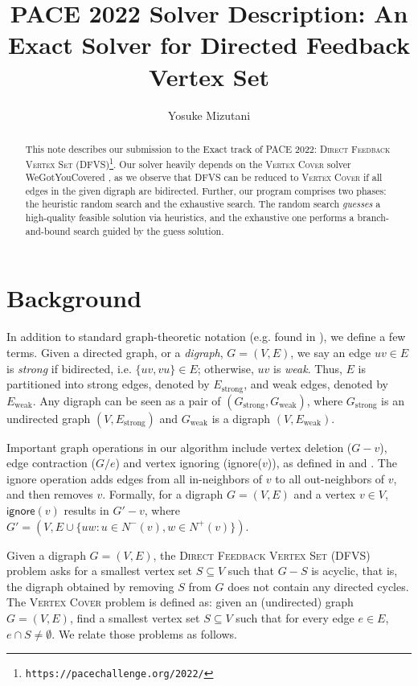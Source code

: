\documentclass[a4paper,UKenglish,cleveref, autoref, thm-restate]{lipics-v2021}
\title{PACE 2022 Solver Description: An Exact Solver for Directed Feedback Vertex Set} %
\author{Yosuke Mizutani}{\universityOfUtah}{yos@cs.utah.edu}{https://orcid.org/0000-0002-9847-4890}{}
\begin{document}
\maketitle

\begin{abstract}
This note describes our submission to the Exact track of PACE 2022:
 \textsc{Direct Feedback Vertex Set} (\textsc{DFVS})\footnote{%
\texttt{https://pacechallenge.org/2022/}}.
Our solver heavily depends on the \textsc{Vertex Cover} solver \textsf{WeGotYouCovered}
 \cite{hespe2020wegotyoucovered},
 as we observe that \textsc{DFVS} can be reduced to \textsc{Vertex Cover}
 if all edges in the given digraph are bidirected.
%
Further, our program comprises two phases: the heuristic random search and the exhaustive search.
The random search \textit{guesses} a high-quality feasible solution via heuristics,
 and the exhaustive one performs a branch-and-bound search guided by the guess solution.
\end{abstract}

\section{Background}
\label{sec:background}

In addition to standard graph-theoretic notation (e.g. found in \cite{diestel2017graph}),
 we define a few terms.
Given a directed graph, or a \textit{digraph}, $G=(V,E)$,
 we say an edge $uv \in E$ is \textit{strong} if bidirected, i.e. $\{uv, vu\} \in E$;
 otherwise, $uv$ is \textit{weak}.
Thus, $E$ is partitioned into strong edges, denoted by $E_\text{strong}$,
 and weak edges, denoted by $E_\text{weak}$.
%
Any digraph can be seen as a pair of $(G_\text{strong}, G_\text{weak})$,
 where $G_\text{strong}$ is an undirected graph $(V,E_\text{strong})$
 and $G_\text{weak}$ is a digraph $(V,E_\text{weak})$.

Important graph operations in our algorithm include vertex deletion ($G-v$),
 edge contraction ($G/e$) and vertex ignoring (\textsf{ignore}($v$)),
 as defined in \cite{levy_contraction_1988} and \cite{hen-ming_lin_computing_2000}.
%
The \textsf{ignore} operation adds edges from all in-neighbors of $v$ to all out-neighbors of $v$,
 and then removes $v$.
Formally, for a digraph $G=(V,E)$ and a vertex $v \in V$, $\textsf{ignore}(v)$ results in
 $G' - v$, where $G'=(V, E \cup \{uw: u \in N^-(v), w \in N^+(v) \})$.

Given a digraph $G=(V,E)$,
 the \textsc{Direct Feedback Vertex Set} (\textsc{DFVS}) problem asks for a smallest vertex set $S \subseteq V$
 such that $G-S$ is acyclic, that is, the digraph obtained by removing $S$ from $G$ does not contain
 any directed cycles.
The \textsc{Vertex Cover} problem is defined as: given an (undirected) graph $G=(V,E)$,
 find a smallest vertex set $S \subseteq V$ such that for every edge $e \in E$, $e \cap S \neq \emptyset$.
We relate those problems as follows.
\end{document}
